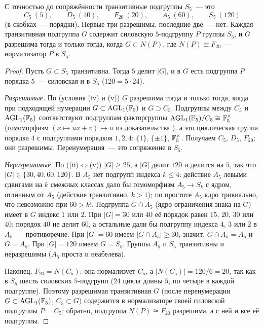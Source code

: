 \begin{proposition}[4.18a]
С точностью до сопряжённости транзитивные подгруппы $S_5$~--- это
\[
C_5\ (5),\qquad D_5\ (10),\qquad F_{20}\ (20),\qquad A_5\ (60),\qquad S_5\ (120)
\]
\textup(в скобках~--- порядки\textup). Первые три разрешимы, последние две~--- нет. Каждая транзитивная подгруппа $G$ содержит
силовскую $5$-подгруппу $P$ группы $S_5$, и $G$ разрешима тогда и только тогда, когда $G\subset N(P)$, где
$N(P)\cong F_{20}$~--- нормализатор $P$ в $S_5$.
\end{proposition}

\begin{proof}
Пусть $G\subset S_5$ транзитивна. Тогда $5$ делит $|G|$, и в $G$ есть подгруппа $P$ порядка $5$~--- силовская и в $S_5$
($120=5\cdot24$).

\emph{Разрешимые.} По  (условия (iv) и (v)) $G$ разрешима тогда и только тогда, когда при подходящей нумерации
$G\subset\mathrm{AGL}_1(\mathbb F_5)$ и $G\supset C_5$. Подгруппы между $C_5$ и $\mathrm{AGL}_1(\mathbb F_5)$ соответствуют подгруппам
факторгруппы $\mathrm{AGL}_1(\mathbb F_5)/C_5\cong\mathbb F_5^\times$ (гомоморфизм $(x\mapsto ux+v)\mapsto u$ из доказательства ), а
это циклическая группа порядка $4$ с подгруппами порядков $1,2,4$: $\{1\}$, $\{\pm1\}$, $\mathbb F_5^\times$. Получаем $C_5$, $D_5$,
$F_{20}$; они разрешимы. Перенумерация~--- это сопряжение в $S_5$.

\emph{Неразрешимые.} По  ((ii)$\Leftrightarrow$(v)) $|G|\ge25$, а $|G|$ делит $120$ и делится на $5$, так что
$|G|\in\{30,40,60,120\}$. В $A_5$ нет подгрупп индекса $k\le4$: действие $A_5$ левыми сдвигами на $k$ смежных классах
дало бы гомоморфизм $A_5\to S_k$ с ядром, отличным от $A_5$ (действие транзитивно, $k>1$); по простоте $A_5$ ядро
тривиально, что невозможно при $60>k!$. Подгруппа $G\cap A_5$ (ядро ограничения знака на $G$) имеет в $G$ индекс $1$ или
$2$. При $|G|=30$ или $40$ её порядок равен $15$, $20$, $30$ или $40$; порядок $40$ не делит $60$, а остальные дали бы
подгруппу индекса $4$, $3$ или $2$ в $A_5$~--- противоречие. При $|G|=60$ имеем $|G\cap A_5|\ge30$, значит, $G\cap A_5=A_5$ и $G=A_5$. При $|G|=120$ имеем $G=S_5$.
Группы $A_5$ и $S_5$ транзитивны и неразрешимы ($A_5$ проста и неабелева).

Наконец, $F_{20}=N(C_5)$: она нормализует $C_5$, а $|N(C_5)|=120/6=20$, так как в $S_5$ шесть силовских $5$-подгрупп
($24$ цикла длины $5$, по четыре в каждой подгруппе). Поэтому разрешимая транзитивная $G$ (после перенумерации
$G\subset\mathrm{AGL}_1(\mathbb F_5)$, $C_5\subset G$) содержится в нормализаторе своей силовской подгруппы $P=C_5$; обратно,
подгруппа $N(P)\cong F_{20}$ разрешима, а с ней и все её подгруппы.
\end{proof}

